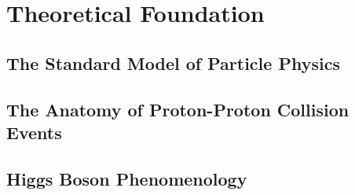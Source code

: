 \chapter{Theoretical Foundation}
\label{chap:theory}

\section{The Standard Model of Particle Physics}
\label{sec:sm}


\section{The Anatomy of Proton-Proton Collision Events}
\label{sec:anatomy}




\section{Higgs Boson Phenomenology}
\label{sec:higgs-phen}


